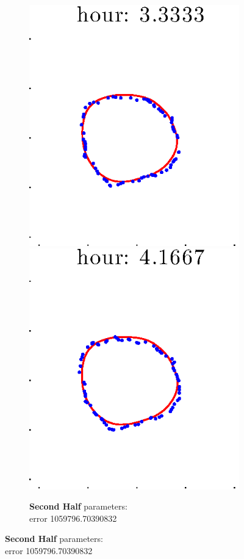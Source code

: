 \documentclass[12pt]{article}
\begin{document}
\begin{figure}[h!]
\begin{subfigure}[b]{.3\textwidth}
		\includegraphics[height=.15\textheight]{Pos5exp2/firsthalf/second5.eps}
		\includegraphics[height=.15\textheight]{Pos5exp2/firsthalf/second6.eps}
		\caption{\textbf{Second Half} parameters: \\error 1059796.70390832}
	\end{subfigure}
\end{figure}
\end{document}
